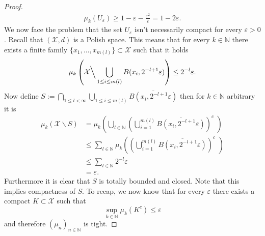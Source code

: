 \documentclass[11pt,a4paper]{article}
\begin{document}
\begin{proof}
\begin{align*}
\mu_k(U_\varepsilon)\geq{}1-\varepsilon-\frac{\varepsilon^2}{\varepsilon} = 1-2\varepsilon.
\end{align*}
We now face the problem that the set $U_\varepsilon$ isn't necessarily compact for every $\varepsilon>0$. Recall that $(\mathcal{X},d)$ is a Polish space. This means that for every $k\in\mathbb{N}$ there exists a finite family $\{x_1,\ldots,x_{m(l)}\}\subset\mathcal{X}$ such that it holds
\begin{align*}
\mu_k\left(\mathcal{X}\Big\backslash\bigcup\limits_{1\leq{}i\leq{}m(l)}B(x_i,2^{-l+1}\varepsilon{})\right)\leq{}2^{-l}\varepsilon.
\vspace{0.25em}
\end{align*} 
Now define $S:=\bigcap\limits_{1\leq{}l<\infty}\bigcup\limits_{1\leq{}i\leq{}m(l)} \overline{B(x_i,2^{-l+1}\varepsilon)}$ then for $k\in\mathbb{N}$ arbitrary it is
\begin{align*}
\mu_k(\mathcal{X}\backslash{}S) &= \mu_k\left(\bigcup\limits_{l\in\mathbb{N}}\left(\bigcup\limits_{i=1}^{m(l)}\overline{B(x_i,2^{-l+1}\varepsilon)}\right)^c\,\,\right)\\[5pt]&\leq\sum\limits_{l\in\mathbb{N}}\mu_k\left(\left(\bigcup\limits_{i=1}^{m(l)}\overline{B(x_i,2^{-l+1}\varepsilon)}\right)^c\,\,\right)\\[5pt]&\leq\sum\limits_{l\in\mathbb{N}}2^{-l}\varepsilon\\&=\varepsilon.
\end{align*}
Furthermore it is clear that $S$ is totally bounded and closed. Note that this implies compactness of $S.$
To recap, we now know that for every $\varepsilon$ there exists a compact $K\subset\mathcal{X}$ such that 
\[
\sup\limits_{k\in\mathbb{N}}\mu_k(K^c)\leq\varepsilon
\]
and therefore $(\mu_n)_{n\in\mathbb{N}}$ is tight.
\end{proof}
\end{document}
